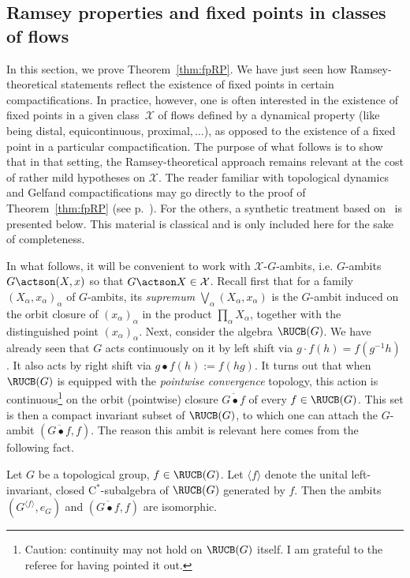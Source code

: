 \subsection{Ramsey properties and fixed points in classes of flows}
\label{section:ambits}

In this section, we prove Theorem~\ref{thm:fpRP}. We have just seen how Ramsey-theoretical statements reflect the existence of fixed points in certain compactifications. In practice, however, one is often interested in the existence of fixed points in a given class~$\mathcal X$ of flows defined by a dynamical property (like being distal, equicontinuous, proximal$,\ldots$), as opposed to the existence of a fixed point in a particular compactification. The purpose of what follows is to show that in that setting, the Ramsey-theoretical approach remains relevant at the cost of rather mild hypotheses on $\mathcal X$. The reader familiar with topological dynamics and Gelfand compactifications may go directly to the proof of Theorem~\ref{thm:fpRP} (see p.~\pageref{proofofthm}). For the others, a synthetic treatment based on~\cite[Chapter~IV, Sections~4 and~5]{dV} is presented below. This material is classical and is only included here for the sake of completeness.


In what follows, it will be convenient to work with $\mathcal X$-$G$-ambits, i.e. $G$-ambits $G\actson(X,x)$ so that $G\actson X \in \mathcal X$. Recall first that for a family $(X_{\alpha}, x_{\alpha})_{\alpha}$ of $G$-ambits, its \emph{supremum} $\bigvee_{\alpha}(X_{\alpha},x_{\alpha})$ is the $G$-ambit induced on the orbit closure of $(x_{\alpha})_{\alpha}$ in the product $\prod_{\alpha}X_{\alpha}$, together with the distinguished point $(x_{\alpha})_{\alpha}$. Next, consider the algebra $\RUCB(G)$. We have already seen that $G$ acts continuously on it by left shift via $g\cdot f (h)=f(g^{-1}h)$. It also acts by right shift via $g\bullet f(h):=f(hg)$. It turns out that when $\RUCB(G)$ is equipped with the \emph{pointwise convergence} topology, this action is continuous\footnote{Caution: continuity may not hold on $\RUCB(G)$ itself. I am grateful to the referee for having pointed it out.} on the orbit (pointwise) closure $\overline{G\bullet f}$ of every $f\in \RUCB(G)$. This set is then a compact invariant subset of $\RUCB(G)$, to which one can attach the $G$-ambit $(\overline{G\bullet f}, f)$. The reason this ambit is relevant here comes from the following fact.

\begin{prop}\label{prop:Gelfand}
Let $G$ be a topological group, $f\in \RUCB(G)$. Let $\langle f \rangle$ denote the unital left-invariant, closed C$^{*}$-subalgebra of $\RUCB(G)$ generated by $f$. Then the ambits $(G^{\langle f \rangle},e_{G})$ and $(\overline{G\bullet f},f)$ are isomorphic.
\end{prop}

